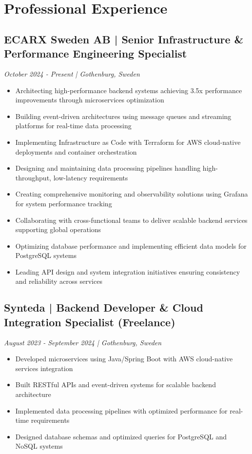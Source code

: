 \documentclass[11pt,a4paper]{article}
\begin{document}
\section*{Professional Experience}
\subsection*{ECARX Sweden AB | Senior Infrastructure \& Performance Engineering Specialist}
\textit{October 2024 - Present | Gothenburg, Sweden}
\begin{itemize}[noitemsep]
\item Architecting high-performance backend systems achieving 3.5x performance improvements through microservices optimization
\item Building event-driven architectures using message queues and streaming platforms for real-time data processing
\item Implementing Infrastructure as Code with Terraform for AWS cloud-native deployments and container orchestration
\item Designing and maintaining data processing pipelines handling high-throughput, low-latency requirements
\item Creating comprehensive monitoring and observability solutions using Grafana for system performance tracking
\item Collaborating with cross-functional teams to deliver scalable backend services supporting global operations
\item Optimizing database performance and implementing efficient data models for PostgreSQL systems
\item Leading API design and system integration initiatives ensuring consistency and reliability across services
\end{itemize}

\subsection*{Synteda | Backend Developer \& Cloud Integration Specialist (Freelance)}
\textit{August 2023 - September 2024 | Gothenburg, Sweden}
\begin{itemize}[noitemsep]
\item Developed microservices using Java/Spring Boot with AWS cloud-native services integration
\item Built RESTful APIs and event-driven systems for scalable backend architecture
\item Implemented data processing pipelines with optimized performance for real-time requirements
\item Designed database schemas and optimized queries for PostgreSQL and NoSQL systems
\end{itemize}
\end{document}
